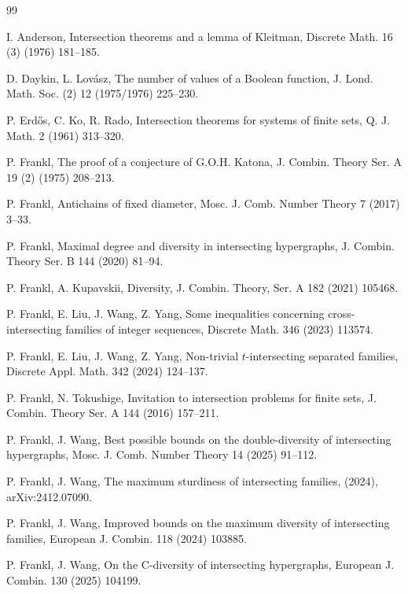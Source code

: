 \documentclass[11pt]{article}
\begin{document}
\begin{thebibliography}{99}

I. Anderson, Intersection theorems and a lemma of Kleitman, Discrete Math. 16 (3) (1976) 181--185. 

 D. Daykin, L. Lov\'{a}sz, 
 The number of values of a Boolean function, 
 J. Lond. Math. Soc. (2) 12 (1975/1976) 225--230. 

 
P. Erd\H{o}s, C. Ko, R. Rado, 
Intersection theorems for systems of finite sets, 
Q. J. Math. 2 (1961) 313--320.





P. Frankl, The proof of a conjecture of G.O.H. Katona, 
J. Combin. Theory Ser. A 19 (2) (1975) 208--213.

P. Frankl, Antichains of fixed diameter, Mosc. J. Comb. Number Theory 7 (2017) 3--33.

P. Frankl, 
Maximal degree and diversity in intersecting hypergraphs, 
J. Combin. Theory Ser. B 144 (2020) 81--94.


P. Frankl, A. Kupavskii, 
Diversity, 
J. Combin. Theory, Ser. A 182 (2021) 105468. 

P. Frankl, E. Liu, J. Wang, Z. Yang,  
Some inequalities concerning cross-intersecting families of integer sequences, 
Discrete Math.  346 (2023) 113574.


P. Frankl, E. Liu, J. Wang, Z. Yang,
Non-trivial $t$-intersecting separated families, 
Discrete Appl. Math. 342 (2024) 124--137.


P. Frankl, N. Tokushige,  
Invitation to intersection problems for finite sets, 
J. Combin. Theory Ser. A 144 (2016) 157--211. 


P. Frankl, J. Wang, 
Best possible bounds on the double-diversity of  intersecting hypergraphs, Mosc. J. Comb. Number Theory 14 (2025) 91--112.

P. Frankl, J. Wang, 
The maximum sturdiness of intersecting families, (2024), arXiv:2412.07090.

P. Frankl, J. Wang, Improved bounds on the maximum diversity of intersecting families, 
European J. Combin. 118 (2024) 103885.

P. Frankl, J. Wang, On the C-diversity of intersecting hypergraphs, European J. Combin. 130 (2025) 104199.



\end{thebibliography}
\end{document}
